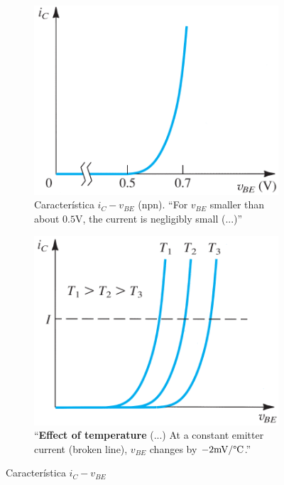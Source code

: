 \vspace{-0.5em}
\begin{figure}[H]
    \begin{subfigure}[b]{0.475\linewidth}
        \centering
        \includegraphics[width = 0.9\linewidth]{img/3/BJT/iC-vBE.png}
        \caption{Característica $i_C-v_\textit{BE}$ (npn). ``For $v_\textit{BE}$ smaller than about $0.5$V, the current is negligibly small (...)''\cite{sedra-smith:microelectronic-circuits}}
        \label{fig:i-vBE}
    \end{subfigure}\hfill
    \begin{subfigure}[b]{0.475\linewidth}
        \centering
        \includegraphics[width = 0.9\linewidth]{img/3/BJT/iC-vBE-T.png}
        \caption{``\textbf{Effect of temperature} (...) At a constant emitter current (broken
line), $v_\textit{BE}$ changes by $-2 \text{mV/\textdegree{C}}$.''\cite{sedra-smith:microelectronic-circuits}}
        \label{fig:i-vBE-T}
    \end{subfigure}%
    \caption{Característica $i_C-v_\textit{BE}$}
    \label{fig:iC-vBE}
\end{figure}

